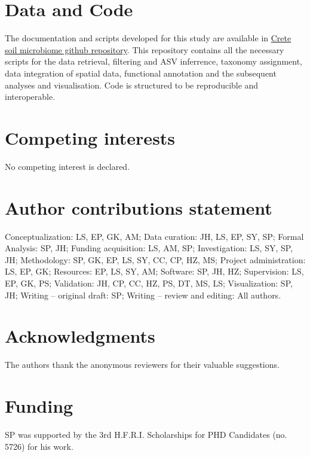 \section{Data and Code}
The documentation and scripts developed for this study are available in
\href{https://github.com/savvas-paragkamian/crete_soil_microbiome/}{Crete soil microbiome github repository}.
This repository contains all the necessary scripts for the data retrieval,
filtering and ASV inferrence, taxonomy assignment, data integration of spatial data, 
functional annotation and the subsequent analyses and visualisation.
Code is structured to be reproducible and interoperable.

\section{Competing interests}
No competing interest is declared.

\section{Author contributions statement}
Conceptualization: LS, EP, GK, AM;
Data curation: JH, LS, EP, SY, SP;
Formal Analysis: SP, JH;
Funding acquisition: LS, AM, SP;
Investigation: LS, SY, SP, JH;
Methodology: SP, GK, EP, LS, SY, CC, CP, HZ, MS;
Project administration: LS, EP, GK;
Resources: EP, LS, SY, AM;
Software: SP, JH, HZ;
Supervision: LS, EP, GK, PS;
Validation: JH, CP, CC, HZ, PS, DT, MS, LS;
Visualization: SP, JH;
Writing – original draft: SP;
Writing – review and editing: All authors.

\section{Acknowledgments}
The authors thank the anonymous reviewers for their valuable suggestions.

\section{Funding}
SP was supported by the 3rd H.F.R.I. Scholarships for PHD Candidates (no. 5726) for his work.
